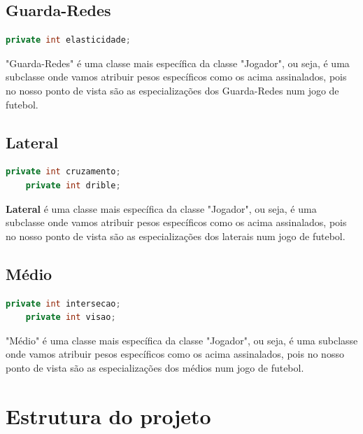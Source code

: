 \documentclass[a4paper]{report}
\begin{document}
	\newpage
	\section{Guarda-Redes}
	\begin{lstlisting}[language=Java]
	private int elasticidade;
	\end{lstlisting}
	
	"Guarda-Redes" é uma classe mais específica da classe "Jogador", ou seja, é uma subclasse onde vamos atribuir pesos específicos como os acima assinalados, pois no nosso ponto de vista são as especializações dos Guarda-Redes num jogo de futebol.
	
	\section{Lateral}
	\begin{lstlisting}[language=Java]
	private int cruzamento;
    private int drible;
	\end{lstlisting}
	
	\textbf{Lateral} é uma classe mais específica da classe "Jogador", ou seja, é uma subclasse onde vamos atribuir pesos específicos como os acima assinalados, pois no nosso ponto de vista são as especializações dos laterais num jogo de futebol.

	\section{Médio}
	\begin{lstlisting}[language=Java]
	private int intersecao;
    private int visao;
	\end{lstlisting}
	
	"Médio" é uma classe mais específica da classe "Jogador", ou seja, é uma subclasse onde vamos atribuir pesos específicos como os acima assinalados, pois no nosso ponto de vista são as especializações dos médios num jogo de futebol.


	\chapter{Estrutura do projeto}
\end{document}
